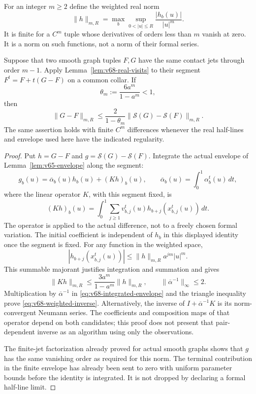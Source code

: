 For an integer $m\ge2$ define the weighted real norm
\begin{equation}\label{eq:v68-weighted-norm}
 \|h\|_{m,R}=\max_b\sup_{0<|u|\le R}\frac{|h_b(u)|}{|u|^m}.
\end{equation}
It is finite for a $C^m$ tuple whose derivatives of orders less than
$m$ vanish at zero.  It is a norm on such functions, not a norm of
their formal series.

\begin{proposition}
\label{prop:v68-weighted-separation}
Suppose that two smooth graph tuples $F,G$ have the same contact jets
through order $m-1$.  Apply Lemma~\ref{lem:v68-real-visits} to their
segment $F^t=F+t(G-F)$ on a common collar.  If
\begin{equation}\label{eq:v68-weight-threshold}
 \theta_m:=\frac{6a^m}{1-a^m}<1,
\end{equation}
then
\begin{equation}\label{eq:v68-weighted-inverse}
 \|G-F\|_{m,R}\le
 \frac{2}{1-\theta_m}
       \|\mathcal S(G)-\mathcal S(F)\|_{m,R}.
\end{equation}
The same assertion holds with finite $C^m$ differences whenever the
real half-lines and envelope used here have the indicated regularity.
\end{proposition}
\begin{proof}
Put $h=G-F$ and $g=\mathcal S(G)-\mathcal S(F)$.  Integrate the
actual envelope of Lemma~\ref{lem:v65-envelope} along the segment:
\begin{equation}\label{eq:v68-integrated-envelope}
 g_b(u)=\overline\alpha_b(u)h_b(u)+(Kh)_b(u),\qquad
 \overline\alpha_b(u)=\int_0^1\alpha_b^t(u)\,dt,
\end{equation}
where the linear operator $K$, with this segment fixed, is
\[
 (Kh)_b(u)=\int_0^1\sum_{j\ge1}
       v_{b,j}^t(u)h_{b+j}(x^t_{b,j}(u))\,dt.
\]
The operator is applied to the actual difference, not to a freely
chosen formal variation.  The initial coefficient is independent of
$h_b$ in this displayed identity once the segment is fixed.
For any function in the weighted space,
\[
 |h_{b+j}(x^t_{b,j}(u))|
       \le \|h\|_{m,R}a^{jm}|u|^m.
\]
This summable majorant justifies integration and summation and gives
\[
 \|Kh\|_{m,R}\le\frac{3a^m}{1-a^m}\|h\|_{m,R},\qquad
 \|\overline\alpha^{-1}\|_\infty\le2.
\]
Multiplication by $\overline\alpha^{-1}$ in
\eqref{eq:v68-integrated-envelope} and the triangle inequality prove
\eqref{eq:v68-weighted-inverse}.  Alternatively, the inverse of
$I+\overline\alpha^{-1}K$ is its norm-convergent Neumann series.
The coefficients and composition maps of that operator depend on both
candidates; this proof does not present that pair-dependent inverse as
an algorithm using only the observations.

The finite-jet factorization already proved for actual smooth graphs
shows that $g$ has the same vanishing order as required for this norm.
The terminal contribution in the finite envelope has already been
sent to zero with uniform parameter bounds before the identity is
integrated.  It is not dropped by declaring a formal half-line limit.
\end{proof}

